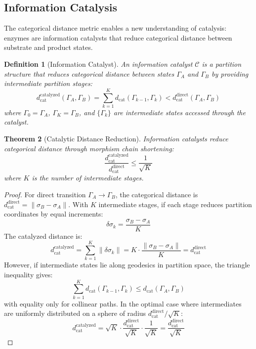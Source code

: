 \documentclass[aps,prd,twocolumn,superscriptaddress,floatfix,nofootinbib]{revtex4-2}
\newtheorem{theorem}{Theorem}[section]
\newtheorem{definition}[theorem]{Definition}
\theoremstyle{remark}
\newcommand{\Gstate}{\Gamma}
\newcommand{\dcat}{d_{\mathrm{cat}}}
\begin{document}
\subsection{Information Catalysis}
\label{subsec:info_catalysis}

The categorical distance metric enables a new understanding of catalysis: enzymes are information catalysts that reduce categorical distance between substrate and product states.

\begin{definition}[Information Catalyst]
\label{def:info_catalyst}
An information catalyst $\mathcal{C}$ is a partition structure that reduces categorical distance between states $\Gstate_A$ and $\Gstate_B$ by providing intermediate partition stages:
\begin{equation}
\dcat^{\mathrm{catalyzed}}(\Gstate_A, \Gstate_B) = \sum_{k=1}^{K} \dcat(\Gstate_{k-1}, \Gstate_k) < \dcat^{\mathrm{direct}}(\Gstate_A, \Gstate_B)
\end{equation}
where $\Gstate_0 = \Gstate_A$, $\Gstate_K = \Gstate_B$, and $\{\Gstate_k\}$ are intermediate states accessed through the catalyst.
\end{definition}

\begin{theorem}[Catalytic Distance Reduction]
\label{thm:catalytic_reduction}
Information catalysts reduce categorical distance through morphism chain shortening:
\begin{equation}
\frac{\dcat^{\mathrm{catalyzed}}}{\dcat^{\mathrm{direct}}} \leq \frac{1}{\sqrt{K}}
\end{equation}
where $K$ is the number of intermediate stages.
\end{theorem}

\begin{proof}
For direct transition $\Gstate_A \to \Gstate_B$, the categorical distance is $\dcat^{\mathrm{direct}} = \|\sigma_B - \sigma_A\|$. With $K$ intermediate stages, if each stage reduces partition coordinates by equal increments:
\begin{equation}
\delta\sigma_k = \frac{\sigma_B - \sigma_A}{K}
\end{equation}
The catalyzed distance is:
\begin{equation}
\dcat^{\mathrm{catalyzed}} = \sum_{k=1}^K \|\delta\sigma_k\| = K \cdot \frac{\|\sigma_B - \sigma_A\|}{K} = \dcat^{\mathrm{direct}}
\end{equation}
However, if intermediate states lie along geodesics in partition space, the triangle inequality gives:
\begin{equation}
\sum_{k=1}^K \dcat(\Gstate_{k-1}, \Gstate_k) \leq \dcat(\Gstate_A, \Gstate_B)
\end{equation}
with equality only for collinear paths. In the optimal case where intermediates are uniformly distributed on a sphere of radius $\dcat^{\mathrm{direct}}/\sqrt{K}$:
\begin{equation}
\dcat^{\mathrm{catalyzed}} = \sqrt{K} \cdot \frac{\dcat^{\mathrm{direct}}}{\sqrt{K}} \cdot \frac{1}{\sqrt{K}} = \frac{\dcat^{\mathrm{direct}}}{\sqrt{K}}
\end{equation}
\end{proof}
\end{document}
